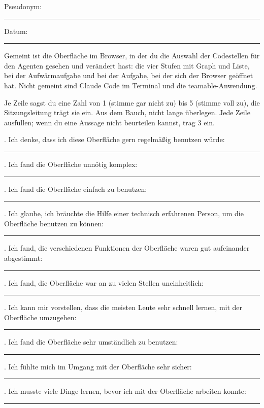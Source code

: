 \noindent Pseudonym:~\rule{2.5em}{0.4pt}\par
\noindent Datum:~\rule{2.5em}{0.4pt}\par
Gemeint ist die Oberfläche im Browser, in der du die Auswahl der Codestellen für den Agenten gesehen und verändert hast: die vier Stufen mit Graph und Liste, bei der Aufwärmaufgabe und bei der Aufgabe, bei der sich der Browser geöffnet hat. Nicht gemeint sind Claude Code im Terminal und die teamable-Anwendung.

Je Zeile sagst du eine Zahl von 1 (stimme gar nicht zu) bis 5 (stimme voll zu), die Sitzungsleitung trägt sie ein. Aus dem Bauch, nicht lange überlegen. Jede Zeile ausfüllen; wenn du eine Aussage nicht beurteilen kannst, trag 3 ein.

. Ich denke, dass ich diese Oberfläche gern regelmäßig benutzen würde:~\rule{2.5em}{0.4pt}\par
{}. Ich fand die Oberfläche unnötig komplex:~\rule{2.5em}{0.4pt}\par
{}. Ich fand die Oberfläche einfach zu benutzen:~\rule{2.5em}{0.4pt}\par
{}. Ich glaube, ich bräuchte die Hilfe einer technisch erfahrenen Person, um die Oberfläche benutzen zu können:~\rule{2.5em}{0.4pt}\par
{}. Ich fand, die verschiedenen Funktionen der Oberfläche waren gut aufeinander abgestimmt:~\rule{2.5em}{0.4pt}\par
{}. Ich fand, die Oberfläche war an zu vielen Stellen uneinheitlich:~\rule{2.5em}{0.4pt}\par
{}. Ich kann mir vorstellen, dass die meisten Leute sehr schnell lernen, mit der Oberfläche umzugehen:~\rule{2.5em}{0.4pt}\par
{}. Ich fand die Oberfläche sehr umständlich zu benutzen:~\rule{2.5em}{0.4pt}\par
{}. Ich fühlte mich im Umgang mit der Oberfläche sehr sicher:~\rule{2.5em}{0.4pt}\par
{}. Ich musste viele Dinge lernen, bevor ich mit der Oberfläche arbeiten konnte:~\rule{2.5em}{0.4pt}\par
